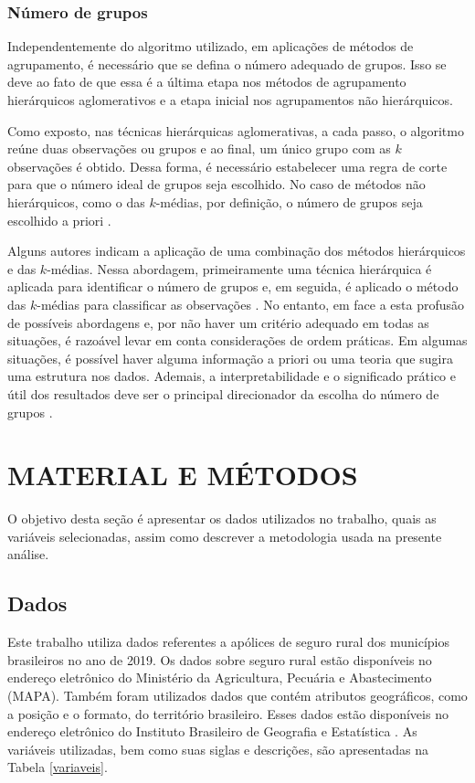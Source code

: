 \documentclass[
	12pt,				%
	openright,			%
	oneside,			%
	a4paper,			%
	chapter=TITLE,		%
	section=TITLE,		%
	english,			%
	french,				%
	spanish,			%
	brazil				%
	]{abntex2}
\begin{document}
\subsubsection{Número de grupos}\label{n_grupos}

Independentemente do algoritmo utilizado, em aplicações de métodos de agrupamento, é necessário que se defina o número adequado de grupos. Isso se deve ao fato de que essa é a última etapa nos métodos de agrupamento hierárquicos aglomerativos e a etapa inicial nos agrupamentos não hierárquicos. 

Como exposto, nas técnicas hierárquicas aglomerativas, a cada passo, o algoritmo reúne duas observações ou grupos e ao final, um único grupo com as $k$ observações é obtido. Dessa forma, é necessário estabelecer uma regra de corte para que o número ideal de grupos seja escolhido. No caso de métodos não hierárquicos, como o das $k$-médias, por definição, o número de grupos seja escolhido a priori \cite{mingoti10}.

Alguns autores indicam a aplicação de uma combinação dos métodos hierárquicos e das $k$-médias. Nessa abordagem, primeiramente uma técnica hierárquica é aplicada para identificar o número de grupos e, em seguida, é aplicado o método das $k$-médias para classificar as observações \cite{hair09, mingoti10}. No entanto, em face a esta profusão de possíveis abordagens e, por não haver um critério adequado em todas as situações, é razoável levar em conta considerações de ordem práticas. Em algumas situações, é possível haver alguma informação a priori ou uma teoria que sugira uma estrutura nos dados. Ademais, a interpretabilidade e o significado prático e útil dos resultados deve ser o principal direcionador da escolha do número de grupos \cite{everitt11}.

\section{\textbf{MATERIAL E MÉTODOS}}\label{metodologia}

O objetivo desta seção é apresentar os dados utilizados no trabalho, quais as variáveis selecionadas, assim como descrever a metodologia usada na presente análise.

\subsection{Dados}
    
Este trabalho utiliza dados referentes a apólices de seguro rural dos municípios brasileiros no ano de 2019. Os dados sobre seguro rural estão disponíveis no endereço eletrônico do Ministério da Agricultura, Pecuária e Abastecimento (MAPA). Também foram utilizados dados que contém atributos geográficos, como a posição e o formato, do território brasileiro. Esses dados estão disponíveis no endereço eletrônico do Instituto Brasileiro de Geografia e Estatística \cite{ibge20}. As variáveis utilizadas, bem como suas siglas e descrições, são apresentadas na Tabela \ref{variaveis}.
    
\end{document}
